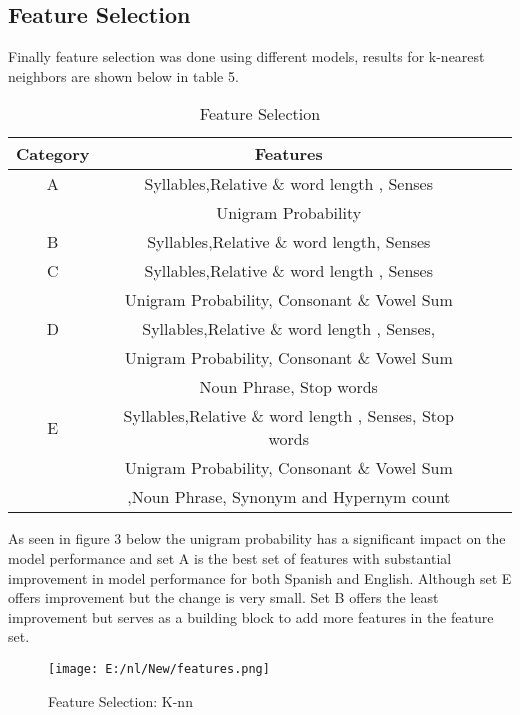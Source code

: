 \documentclass[10pt,a4paper]{article}
\begin{document}
\subsection{Feature Selection}
Finally feature selection was done using different models, results for k-nearest neighbors are shown below in table 5.
\begin{table}[!htbp]
\begin{adjustbox}{right=10cm}
\begin{tabular}{|c|c|c|c|} \hline
\textbf{Category} &   \textbf{Features}  \\ \hline
A  & 	Syllables,Relative \& word length  , Senses \\ &  Unigram Probability\\ \hline
B & Syllables,Relative \& word length, Senses  \\ \hline
C  & Syllables,Relative \& word length  , Senses \\  &  Unigram Probability, Consonant \& Vowel Sum \\ \hline
D  & Syllables,Relative \& word length  , Senses,\\  &  Unigram Probability, Consonant \& Vowel Sum \\  & Noun Phrase, Stop words \\ \hline
E  & Syllables,Relative \& word length  , Senses, Stop words\\  &  Unigram Probability, Consonant \& Vowel Sum  \\ & ,Noun Phrase, Synonym and Hypernym count \\ \hline
\end{tabular}
\end{adjustbox}
\caption{Feature Selection}
\label{T:Features left after features}
\end{table}
As seen in figure 3 below the unigram probability has a significant impact on the model performance and set A is the best set of features with substantial improvement in model performance for both Spanish and English. Although set E offers improvement but the change is very small. Set B offers the least improvement but serves as a building block to add more features in the feature set.
\begin{figure}[!htbp]
\texttt{[image: E:/nl/New/features.png]}
\caption{Feature Selection: K-nn }
\end{figure}
\end{document}
